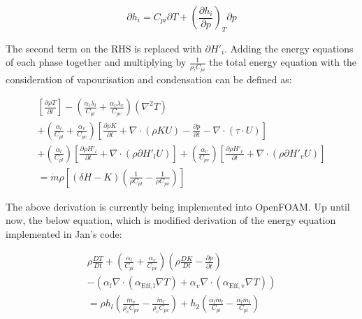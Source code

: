 \documentclass{article}
\begin{document}
\begin{equation}
\partial{h_i} = C_{pi}\partial{T} + \left(\frac{\partial{h_i}}{\partial{p}}\right)_T \partial{p}
\end{equation}

The second term on the RHS is replaced with $\partial{H'_i}$.
Adding the energy equations of each phase together and multiplying by $\frac{1}{\rho{_i}C_{pi}}$ the total energy equation with the consideration of vapourisation and condensation can be defined as:

\begin{equation}
\begin{split}
\left[\frac{\partial{\rho T}}{\partial{t}}\right] - \left(\frac{\alpha{_l}\lambda{_l}}{C_{pl}} + \frac{\alpha{_v}\lambda{_v}}{C_{pv}}\right)\left({\nabla}^2 T\right) \\
+ \left(\frac{\alpha{_l}}{C_{pl}} + \frac{\alpha{_v}}{C_{pv}}\right)\left[\frac{\partial{\rho}K}{\partial{t}} + \nabla\cdot(\rho K U) - \frac{\partial{p}}{\partial{t}} - \nabla\cdot(\tau\cdot U)\right] \\
+ \left(\frac{\alpha{_l}}{C_{pl}}\right)\left[\frac{\partial{\rho}{H'_l}}{\partial{t}} + \nabla\cdot(\rho \partial{H'_l} U)\right] + \left(\frac{\alpha{_v}}{C_{pv}}\right)\left[\frac{\partial{\rho}{H'_v}}{\partial{t}} + \nabla\cdot(\rho \partial{H'_v} U)\right] \\
= \dot{m}\rho\left[(\delta{H}-K)\left(\frac{1}{\rho C_{pl}}-\frac{1}{\rho C_{pv}}\right)\right]
\end{split}
\end{equation}

The above derivation is currently being implemented into OpenFOAM. Up until now, the below equation, which is modified derivation of the energy equation implemented in Jan's code:

\begin{equation}
\begin{split}
\rho\frac{DT}{Dt} + (\frac{\alpha_l}{C_{pl}} + \frac{\alpha_v}{C_{pv}})(\rho\frac{DK}{Dt}-\frac{{\partial}p}{{\partial}t}) \\
- (\alpha_l\nabla\cdotp(\alpha_\mathrm{Eff,l}\nabla T) + \alpha_v\nabla\cdotp(\alpha_\mathrm{Eff,v}\nabla T)) \\
= \rho h_l (\frac{\dot{m}_v}{\rho_v C_{pv}} - \frac{\dot{m}_l}{\rho_v C_{pv}}) + h_2 (\frac{\alpha_l \dot{m}_l}{C_{pl}} - \frac{\alpha_l \dot{m}_l}{C_{pl}})
\end{split}
\end{equation}
\end{document}

